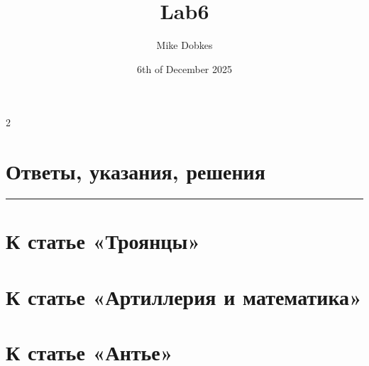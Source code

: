 \documentclass[8pt]{article}
\title{Lab6}
\author{Mike Dobkes}
\date{6th of December 2025}
\begin{document}
\begin{minipage}[t][20cm][t]{\textwidth}
\linespread{1.5}
\begin{multicols}{2}

{
\raggedright
\section*{Ответы, указания, решения}
\noindent\rule{\columnwidth}{1pt}
}
\setlength{\parindent}{1em}


{
\raggedright
\section*{К статье «Троянцы»}
}
\setlength{\parindent}{1em}


{
\raggedright
\section*{К статье «Артиллерия и математика»}
}
\setlength{\parindent}{1em}


{
\raggedright
\section*{К статье «Антье»}
}
\setlength{\parindent}{1em}


\end{multicols}


\end{minipage}
\end{document}
